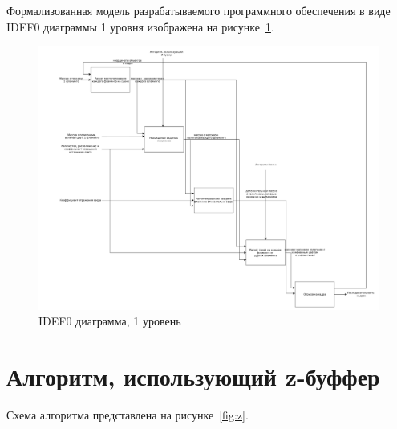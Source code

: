 Формализованная модель разрабатываемого программного обеспечения в виде IDEF0 диаграммы 1 уровня изображена на рисунке~\ref{fig:idef1}.

\begin{figure}[h!]
	\centering
	\includegraphics[width=\linewidth]{img/idef1}
	\caption{IDEF0 диаграмма, 1 уровень}
	\label{fig:idef1}
\end{figure}


\section{Алгоритм, использующий z-буффер}

Схема алгоритма представлена на рисунке~\ref{fig:z}.

